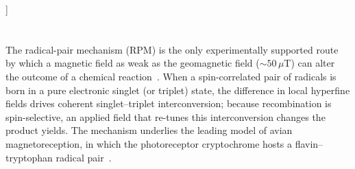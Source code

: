 \documentclass[twoside,twocolumn,9pt]{article}
\begin{document}
\begin{@twocolumnfalse}
\begin{tabular}{m{4.5cm} p{13.5cm} }
\end{tabular}

 \end{@twocolumnfalse} \vspace{0.6cm}

  ]

\renewcommand*\rmdefault{bch}\normalfont\upshape
\rmfamily
\section*{}
\vspace{-1cm}










The radical-pair mechanism (RPM) is the only experimentally supported route by
which a magnetic field as weak as the geomagnetic field ($\sim 50\,\mu$T) can
alter the outcome of a chemical reaction~\cite{Steiner1989,Hore2016}. When a
spin-correlated pair of radicals is born in a pure electronic singlet (or
triplet) state, the difference in local hyperfine fields drives coherent
singlet--triplet interconversion; because recombination is spin-selective, an
applied field that re-tunes this interconversion changes the product yields. The
mechanism underlies the leading model of avian magnetoreception, in which the
photoreceptor cryptochrome hosts a flavin--tryptophan radical
pair~\cite{Ritz2000,Maeda2012,Xu2021}.
 
\end{document}
